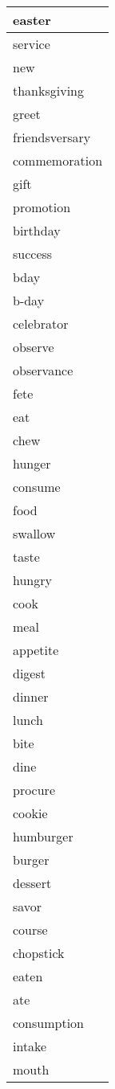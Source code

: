 \begin{longtable}{|p{3cm}|}
easter \\ \hline
service \\ \hline
new \\ \hline
thanksgiving \\ \hline
greet \\ \hline
friendsversary \\ \hline
commemoration \\ \hline
gift \\ \hline
promotion \\ \hline
birthday \\ \hline
success \\ \hline
bday \\ \hline
b-day \\ \hline
celebrator \\ \hline
observe \\ \hline
observance \\ \hline
fete \\ \hline
eat \\ \hline
chew \\ \hline
hunger \\ \hline
consume \\ \hline
food \\ \hline
swallow \\ \hline
taste \\ \hline
hungry \\ \hline
cook \\ \hline
meal \\ \hline
appetite \\ \hline
digest \\ \hline
dinner \\ \hline
lunch \\ \hline
bite \\ \hline
dine \\ \hline
procure \\ \hline
cookie \\ \hline
humburger \\ \hline
burger \\ \hline
dessert \\ \hline
savor \\ \hline
course \\ \hline
chopstick \\ \hline
eaten \\ \hline
ate \\ \hline
consumption \\ \hline
intake \\ \hline
mouth \\ \hline

\end{longtable}
